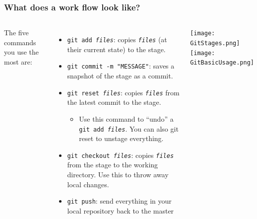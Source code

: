 \documentclass[hyperref={colorlinks=true}]{beamer}
\begin{document}
\begin{frame}%
  \frametitle{What does a \git work flow look like?}
  
  \begin{columns}
    
    
    The five commands you use the most are:
    
      \begin{itemize}
        \item \texttt{git add \textit{files}}: copies \texttt{\textit{files}} (at their current state) to the stage.
        \item \texttt{git commit -m "MESSAGE"}: saves a snapshot of the stage as a commit.
        \item \texttt{git reset \textit{files}}: copies \texttt{\textit{files}} from the latest commit to the stage. 
        \begin{itemize}
          \item Use this command to ``undo'' a \texttt{git add \textit{files}}. You can also git reset to unstage everything.
        \end{itemize}
        \item \texttt{git checkout \textit{files}}:  copies \texttt{\textit{files}} from the stage to the working directory. Use this to throw away local changes.
        \item \texttt{git push}: send everything in your local repository back to the master
      \end{itemize}
    
    
      \begin{center}
        \texttt{[image: GitStages.png]}\\ 
        \vfill
        \texttt{[image: GitBasicUsage.png]}
      \end{center}
    
  \end{columns}
  
  
\end{frame}


\end{document}
